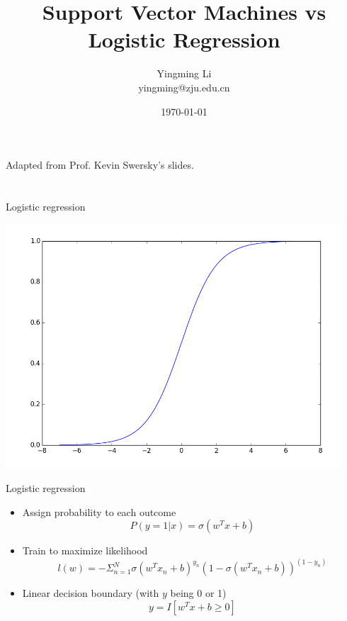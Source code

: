 \documentclass[12pt,notes,mathserif]{beamer}
\title{Support Vector Machines
vs Logistic Regression}
\author[YingmingLi]{Yingming Li \\ yingming@zju.edu.cn}
\institute[DSERC, ZJU]{Data Science \& Engineering Research Center, ZJU}
\date[\today]{\today}
\begin{document}

\begin{frame}[c]
	\titlepage
	\begin{center}
		Adapted from Prof. Kevin Swersky's slides. 
		
	\end{center}
\end{frame}

\section{}\label{section}

\begin{frame}{Logistic regression}

\begin{center}
\includegraphics[width=.9\textwidth]{2018-04-15-19-48-36.png}
\end{center}

\end{frame}

\begin{frame}{Logistic regression}

\begin{itemize}
\item
  Assign probability to each outcome \[P(y=1|x)=\sigma(w^{T}x+b)\]
\item
  Train to maximize likelihood
  \[l(w)=-\Sigma_{n=1}^{N}\sigma(w^{T}x_{n}+b)^{y_{n}}(1-\sigma(w^{T}x_{n}+b))^{(1-y_{n})}\]
\item
  Linear decision boundary (with \(y\) being \(0\) or 1)
  \[y=I[w^{T}x+b\geq 0]\]
\end{itemize}

\end{frame}
\end{document}
